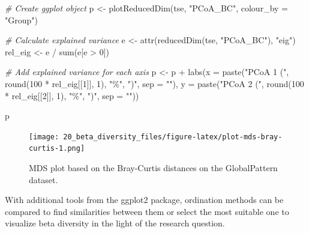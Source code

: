 \documentclass[
]{book}
\newenvironment{Shaded}{\begin{snugshade}}{\end{snugshade}}
\newcommand{\AttributeTok}[1]{\textcolor[rgb]{0.77,0.63,0.00}{#1}}
\newcommand{\CommentTok}[1]{\textcolor[rgb]{0.56,0.35,0.01}{\textit{#1}}}
\newcommand{\DecValTok}[1]{\textcolor[rgb]{0.00,0.00,0.81}{#1}}
\newcommand{\FunctionTok}[1]{\textcolor[rgb]{0.00,0.00,0.00}{#1}}
\newcommand{\NormalTok}[1]{#1}
\newcommand{\OtherTok}[1]{\textcolor[rgb]{0.56,0.35,0.01}{#1}}
\newcommand{\SpecialCharTok}[1]{\textcolor[rgb]{0.00,0.00,0.00}{#1}}
\newcommand{\StringTok}[1]{\textcolor[rgb]{0.31,0.60,0.02}{#1}}
\begin{document}
\begin{Shaded}
\begin{Highlighting}[]
\CommentTok{\# Create ggplot object}
\NormalTok{p }\OtherTok{\textless{}{-}} \FunctionTok{plotReducedDim}\NormalTok{(tse, }\StringTok{"PCoA\_BC"}\NormalTok{,}
                    \AttributeTok{colour\_by =} \StringTok{"Group"}\NormalTok{)}

\CommentTok{\# Calculate explained variance}
\NormalTok{e }\OtherTok{\textless{}{-}} \FunctionTok{attr}\NormalTok{(}\FunctionTok{reducedDim}\NormalTok{(tse, }\StringTok{"PCoA\_BC"}\NormalTok{), }\StringTok{"eig"}\NormalTok{)}
\NormalTok{rel\_eig }\OtherTok{\textless{}{-}}\NormalTok{ e }\SpecialCharTok{/} \FunctionTok{sum}\NormalTok{(e[e }\SpecialCharTok{\textgreater{}} \DecValTok{0}\NormalTok{])}

\CommentTok{\# Add explained variance for each axis}
\NormalTok{p }\OtherTok{\textless{}{-}}\NormalTok{ p }\SpecialCharTok{+} \FunctionTok{labs}\NormalTok{(}\AttributeTok{x =} \FunctionTok{paste}\NormalTok{(}\StringTok{"PCoA 1 ("}\NormalTok{, }\FunctionTok{round}\NormalTok{(}\DecValTok{100} \SpecialCharTok{*}\NormalTok{ rel\_eig[[}\DecValTok{1}\NormalTok{]], }\DecValTok{1}\NormalTok{), }\StringTok{"\%"}\NormalTok{, }\StringTok{")"}\NormalTok{, }\AttributeTok{sep =} \StringTok{""}\NormalTok{),}
              \AttributeTok{y =} \FunctionTok{paste}\NormalTok{(}\StringTok{"PCoA 2 ("}\NormalTok{, }\FunctionTok{round}\NormalTok{(}\DecValTok{100} \SpecialCharTok{*}\NormalTok{ rel\_eig[[}\DecValTok{2}\NormalTok{]], }\DecValTok{1}\NormalTok{), }\StringTok{"\%"}\NormalTok{, }\StringTok{")"}\NormalTok{, }\AttributeTok{sep =} \StringTok{""}\NormalTok{))}

\NormalTok{p}
\end{Highlighting}
\end{Shaded}

\begin{figure}
\centering
\texttt{[image: 20\_beta\_diversity\_files/figure-latex/plot-mds-bray-curtis-1.png]}
\caption{\label{fig:plot-mds-bray-curtis}MDS plot based on the Bray-Curtis distances on the GlobalPattern dataset.}
\end{figure}

With additional tools from the ggplot2 package, ordination methods can be
compared to find similarities between them or select the most suitable one to
visualize beta diversity in the light of the research question.
\end{document}
